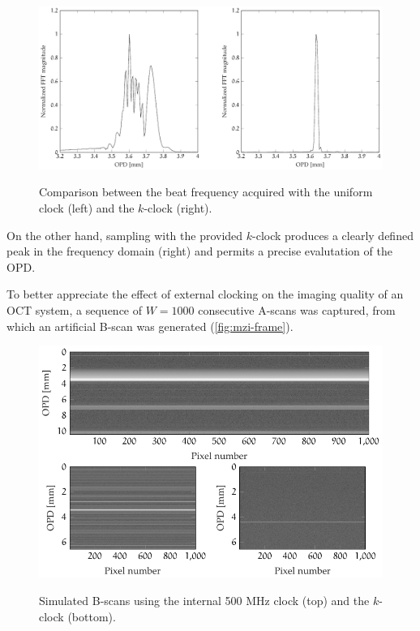 \begin{figure}[hbt]
	{\myfloatalign
		\includegraphics[width=\linewidth]{gfx/ch3/interferometer/interferometer}}
	\caption{Comparison between the beat frequency acquired with the uniform clock (left) and the $k$-clock (right).}\label{fig:mzi-comparison}
\end{figure}

On the other hand, sampling with the provided $k$-clock produces a clearly defined peak in the frequency domain (right) and permits a precise evalutation of the \ac{OPD}. 

To better appreciate the effect of external clocking on the imaging quality of an OCT system, a sequence of $W = 1000$ consecutive A-scans was captured, from which an artificial B-scan was generated (\autoref{fig:mzi-frame}). 


\begin{figure}[hbt]
	{\myfloatalign
		\includegraphics[width=\linewidth]{gfx/ch3/interferometer/interferometer-frame}}
	\caption{Simulated B-scans using the internal 500 MHz clock (top) and the $k$-clock (bottom).}\label{fig:mzi-frame}
\end{figure}

